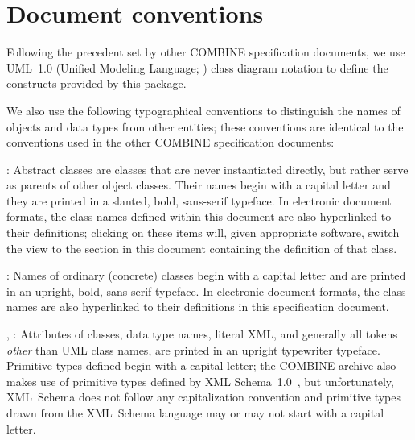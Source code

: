 

\section{Document conventions} \label{conventions} 

Following the precedent set by other COMBINE specification
documents, we use UML~1.0 (Unified Modeling Language; 
\citealt{eriksson:1998,oestereich:1999}) class diagram notation to 
define the constructs provided by this package. 

We also use the following typographical conventions to distinguish the 
names of objects and data types from other entities; these conventions 
are identical to the conventions used in the other COMBINE 
specification documents: 

\begin{description} 

\item {}: Abstract classes are classes that 
are never instantiated directly, but rather serve as parents of other 
object classes. Their names begin with a capital letter and they are 
printed in a slanted, bold, sans-serif typeface. In electronic document 
formats, the class names defined within this document are also 
hyperlinked to their definitions; clicking on these items will, given 
appropriate software, switch the view to the section in this document 
containing the definition of that class. 

\item {}: Names of ordinary (concrete) classes begin with a 
capital letter and are printed in an upright, bold, sans-serif typeface. 
In electronic document formats, the class names are also hyperlinked to 
their definitions in this specification document. 

\item {}, : Attributes of classes, data 
type names, literal XML, and generally all tokens \emph{other} than 
UML class names, are printed in an upright typewriter typeface. 
Primitive types defined begin with a capital letter; the COMBINE archive
also makes use of primitive types defined by XML 
Schema~1.0~\citep{biron:2000,fallside:2000,thompson:2000}, but 
unfortunately, XML~Schema does not follow any capitalization convention 
and primitive types drawn from the XML~Schema language may or may not 
start with a capital letter. 

\end{description} 

